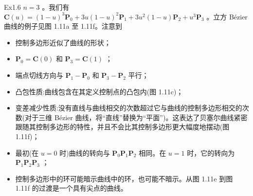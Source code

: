 \documentclass[../main.tex]{subfiles}
\begin{document}
\noindent\begin{minipage}{\linewidth}
Ex1.6 \(n = 3\) 。我们有 \(\mathbf{C}\left( u\right)  = {\left( 1 - u\right) }^{3}{\mathbf{P}}_{0} + {3u}{\left( 1 - u\right) }^{2}{\mathbf{P}}_{1} + 3{u}^{2}\left( {1 - u}\right) {\mathbf{P}}_{2} + {u}^{3}{\mathbf{P}}_{3}\) 。立方 Bézier 曲线的例子见图 1.11a 至 1.11f。注意到

\begin{itemize}
\item 控制多边形近似了曲线的形状；
\item \({\mathbf{P}}_{0} = \mathbf{C}\left( 0\right)\) 和 \({\mathbf{P}}_{3} = \mathbf{C}\left( 1\right)\) ；
\item 端点切线方向与 \({\mathbf{P}}_{1} - {\mathbf{P}}_{0}\) 和 \({\mathbf{P}}_{3} - {\mathbf{P}}_{2}\) 平行；
\item 凸包性质:曲线包含在其定义控制点的凸包内(图 1.11c)；
\item 变差减少性质:没有直线与曲线相交的次数超过它与曲线的控制多边形相交的次数(对于三维 Bézier 曲线，将“直线”替换为“平面”)。这表达了贝塞尔曲线紧密跟随其控制多边形的特性，并且不会比其控制多边形更大幅度地摆动(图 1.11f)；
\item 最初(在 \(u = 0\) 时)曲线的转向与 \({\mathbf{P}}_{0}{\mathbf{P}}_{1}{\mathbf{P}}_{2}\) 相同。在 \(u = 1\) 时，它的转向为 \({\mathbf{P}}_{1}{\mathbf{P}}_{2}{\mathbf{P}}_{3}\) ；
\item 控制多边形中的环可能暗示曲线中的环，也可能不暗示。从图 1.11e 到图 1.11f 的过渡是一个具有尖点的曲线。
\end{itemize}

\begin{center}
\begin{minipage}{12cm}
\centering
\begin{minipage}[t]{5.6cm}\centering
{}
\end{minipage}\hspace{.8cm}%
\begin{minipage}[t]{5.6cm}\centering
{}
\end{minipage}
\par\vspace{3mm}
\par\vspace{3mm}
\captionsetup{font=small,skip=6pt,justification=centering}
\end{minipage}
\end{center}
\end{minipage}
\par\medskip
\end{document}

